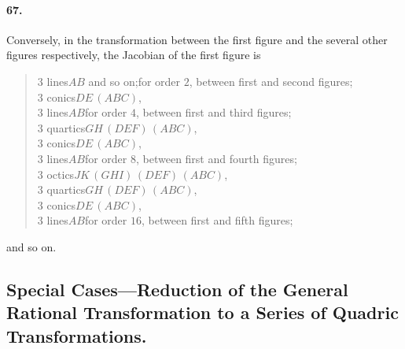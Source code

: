 \documentclass[11pt]{article}
\begin{document}
\medskip

\paragraph{67.}
Conversely, in the transformation between the first figure and the
several other figures respectively, the Jacobian of the first figure is
\begin{quote}
$3$ lines\quad $AB$ and so on;\quad for order $2$, between first and
second figures;\\[2pt]
$3$ conics\quad $DE\,(ABC)$,\\
$3$ lines\qquad $AB$\quad for order $4$, between first and third figures;\\[2pt]
$3$ quartics\quad $GH\,(DEF)\,(ABC)$,\\
$3$ conics\qquad $DE\,(ABC)$,\\
$3$ lines\qquad\qquad $AB$\quad for order $8$, between first and fourth
figures;\\[2pt]
$3$ octics\quad $JK\,(GHI)\,(DEF)\,(ABC)$,\\
$3$ quartics\quad $GH\,(DEF)\,(ABC)$,\\
$3$ conics\qquad $DE\,(ABC)$,\\
$3$ lines\qquad\qquad $AB$\quad for order $16$, between first and fifth
figures;
\end{quote}
and so on.

\bigskip

\subsection*{Special Cases---Reduction of the General Rational
Transformation to a Series of Quadric Transformations.}
\end{document}
